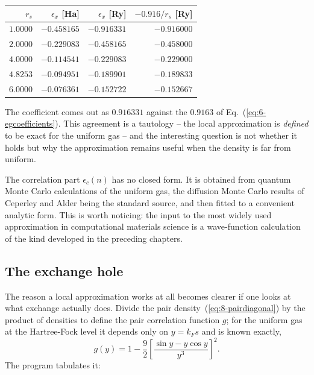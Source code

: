 \begin{center}
\renewcommand{\arraystretch}{1.2}
\setlength{\tabcolsep}{11pt}
\begin{tabular}{rrrr}
\toprule
$r_s$ & $\epsilon_x$ [Ha] & $\epsilon_x$ [Ry] & $-0.916/r_s$ [Ry]\\
\midrule
$1.0000$ & $-0.458165$ & $-0.916331$ & $-0.916000$\\
$2.0000$ & $-0.229083$ & $-0.458165$ & $-0.458000$\\
$4.0000$ & $-0.114541$ & $-0.229083$ & $-0.229000$\\
$4.8253$ & $-0.094951$ & $-0.189901$ & $-0.189833$\\
$6.0000$ & $-0.076361$ & $-0.152722$ & $-0.152667$\\
\bottomrule
\end{tabular}
\end{center}

The coefficient comes out as $0.916331$ against the $0.9163$ of
Eq.~(\ref{eq:6-egcoefficients}).  This agreement is a tautology -- the local
approximation is \emph{defined} to be exact for the uniform gas -- and the
interesting question is not whether it holds but why the approximation
remains useful when the density is far from uniform.

The correlation part $\epsilon_c(n)$ has no closed form.  It is obtained from
quantum Monte Carlo calculations of the uniform gas, the diffusion Monte
Carlo results of Ceperley and Alder being the standard source, and then
fitted to a convenient analytic form.  This is worth noticing: the input to
the most widely used approximation in computational materials science is a
wave-function calculation of the kind developed in the preceding chapters.

\subsection{The exchange hole}
\label{sec:exchangehole}

The reason a local approximation works at all becomes clearer if one looks at
what exchange actually does.  Divide the pair
density~(\ref{eq:8-pairdiagonal}) by the product of densities to define the
pair correlation function $g$; for the uniform gas at the Hartree-Fock level
it depends only on $y=k_F s$ and is known exactly,
\begin{equation}
  g(y) = 1 - \frac{9}{2}
    \left[\frac{\sin y - y\cos y}{y^3}\right]^2 .
  \label{eq:8-paircorrelation}
\end{equation}
The program tabulates it:

